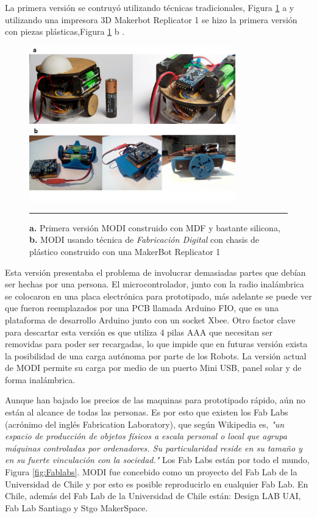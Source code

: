 La primera versión se contruyó utilizando técnicas tradicionales, Figura \ref{fig:analgTodigital} a y utilizando una impresora 3D Makerbot Replicator 1 se hizo la primera versión con piezas plásticas,Figura \ref{fig:analgTodigital} b .

\begin{figure}[htbp]
	\centering
		\includegraphics[width=0.8\textwidth]{./Pictures/modi_analogToDigital.png}
		\rule{35em}{0.5pt}
	\caption[Comparación de construcción análoga y digital]{\textbf{a.} Primera versión MODI construido con MDF y bastante silicona, \textbf{b.} MODI usando técnica de \emph{ Fabricación Digital }con chasis de plástico construido con una MakerBot Replicator 1}
	\label{fig:analgTodigital}
\end{figure}

Esta versión presentaba el problema de involucrar demasiadas partes que debían ser hechas por una persona. El microcontrolador, junto con la radio inalámbrica se colocaron en una placa electrónica para prototipado, más adelante se puede ver que fueron reemplazados por una PCB llamada Arduino FIO, que es una plataforma de desarrollo Arduino junto con un socket Xbee. Otro factor clave para descartar esta versión es que utiliza 4 pilas AAA que necesitan ser removidas para poder ser recargadas, lo que impide que en futuras versión exista la posibilidad de una carga autónoma por parte de los Robots. La versión actual de MODI permite su carga por medio de un puerto Mini USB, panel solar y de forma inalámbrica.

Aunque han bajado los precios de las maquinas para prototipado rápido, aún no están al alcance de todas las personas. Es por esto que existen los Fab Labs (acrónimo del inglés Fabrication Laboratory), que según Wikipedia es, \textit{"un espacio de producción de objetos físicos a escala personal o local que agrupa máquinas controladas por ordenadores. Su particularidad reside en su tamaño y en su fuerte vinculación con la sociedad."} Los Fab Labs están por todo el mundo, Figura \ref{fig:Fablabs}. MODI fue concebido como un proyecto del Fab Lab de la Universidad de Chile y por esto es posible reproducirlo en cualquier Fab Lab. En Chile, además del Fab Lab de la Universidad de Chile están: Design LAB UAI, Fab Lab Santiago y Stgo MakerSpace. 

